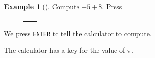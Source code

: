 \documentclass[10pt,]{book}
\theoremstyle{plain}
\theoremstyle{definition}
\theoremstyle{definition}
\newtheorem{example}[theorem]{Example}
\theoremstyle{definition}
\numberwithin{equation}{part}
\newlength{\panelmax}
\begin{document}
\begin{example}[]\label{example-94}
Compute \(-5 + 8\). Press%
{%
\setlength{\panelmax}{0pt}
\newsavebox{\panelboxAHFp}
\newlength{\phAHFp}\setlength{\phAHFp}{\ht\panelboxAHFp+\dp\panelboxAHFp}
\settototalheight{\phAHFp}{\usebox{\panelboxAHFp}}
\setlength{\panelmax}{\maxof{\panelmax}{\phAHFp}}
\newsavebox{\panelboxAHGp}
\newlength{\phAHGp}\setlength{\phAHGp}{\ht\panelboxAHGp+\dp\panelboxAHGp}
\settototalheight{\phAHGp}{\usebox{\panelboxAHGp}}
\setlength{\panelmax}{\maxof{\panelmax}{\phAHGp}}
\leavevmode%
\setlength{\tabcolsep}{0\textwidth}
\begin{figure}
\begin{tabular}{@{}*{2}{c}@{}}
\begin{minipage}[c][\panelmax][t]{0.5\textwidth}\usebox{\panelboxAHFp}\end{minipage}&
\begin{minipage}[c][\panelmax][t]{0.5\textwidth}\usebox{\panelboxAHGp}\end{minipage}\end{tabular}
\end{figure}
}%
\end{example}
\par
We press \lstinline?ENTER? to tell the calculator to compute.%
\par
The calculator has a key for the value of \(\pi\).%
\end{document}
